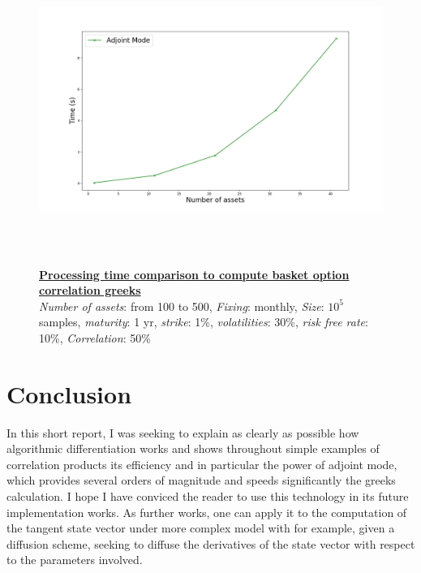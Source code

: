 \documentclass {article}
\begin{document}
		\begin{center}
			\begin{figure}[!h]
				\centering
						\includegraphics[width=15cm, height=10cm]{correlationTime.png}
						\caption{\textbf{\underline{Processing time comparison to compute basket option correlation greeks}} 
						\\ \textit{Number of assets}: from 100 to 500, \textit{Fixing}: monthly, \textit{Size}: $10^{5}$ samples, \textit{maturity}: 1 yr, \textit{strike}: 1\%, \textit{volatilities}: 30\%, \textit{risk free rate}: 10\%, \textit{Correlation}: 50\%}
			\end{figure}
		\end{center}
	
	\section{Conclusion}
	
		In this short report, I was seeking to explain as clearly as possible how algorithmic differentiation works
		and shows throughout simple examples of correlation products its efficiency and in particular the power of adjoint mode,
		which provides several orders of magnitude and speeds significantly the greeks calculation.
		I hope I have conviced the reader to use this technology in its future implementation works.
		As further works, one can apply it to the computation of the tangent state vector under more complex model with for example,
		given a diffusion scheme, seeking to diffuse the derivatives of the state vector with respect to the parameters involved.

	\listoffigures

	
		
\end{document}
